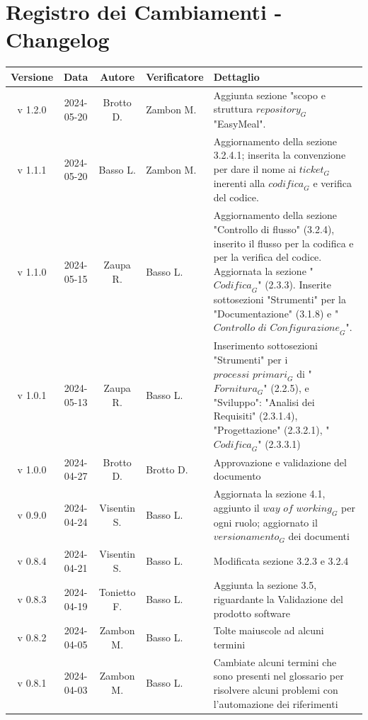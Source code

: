 \documentclass[12pt, oneside]{article}
\begin{document}
\section*{Registro dei Cambiamenti - Changelog}
\begin{longtable}{|c|c|c|p{3cm}|p{7cm}|}
\hline
\textbf{Versione} & \textbf{Data} & \textbf{Autore} & \textbf{Verificatore} & \textbf{Dettaglio} \\
\hline
v 1.2.0 & 2024-05-20 & Brotto D. & Zambon M. & Aggiunta sezione "scopo e struttura $\textit{repository}_G$ "EasyMeal". \\
\hline
v 1.1.1 & 2024-05-20 & Basso L. & Zambon M. & Aggiornamento della sezione 3.2.4.1; inserita la convenzione per dare il nome ai $\textit{ticket}_G$ inerenti alla $\textit{codifica}_G$ e verifica del codice. \\
\hline
v 1.1.0 & 2024-05-15 & Zaupa R. & Basso L. & Aggiornamento della sezione "Controllo di flusso" (3.2.4), inserito il flusso per la codifica e per la verifica del codice. Aggiornata la sezione "$\textit{Codifica}_G$" (2.3.3). Inserite sottosezioni "Strumenti" per la "Documentazione" (3.1.8) e "$\textit{Controllo di Configurazione}_G$".\\
\hline
v 1.0.1 & 2024-05-13 & Zaupa R. & Basso L. & Inserimento sottosezioni "Strumenti" per i $\textit{processi primari}_G$ di "$\textit{Fornitura}_G$" (2.2.5), e "Sviluppo": "Analisi dei Requisiti" (2.3.1.4), "Progettazione" (2.3.2.1), "$\textit{Codifica}_G$" (2.3.3.1) \\
\hline
v 1.0.0 & 2024-04-27 & Brotto D. & Brotto D. & Approvazione e validazione del documento \\
\hline
v 0.9.0 & 2024-04-24 & Visentin S. & Basso L. & Aggiornata la sezione 4.1, aggiunto il $\textit{way of working}_G$ per ogni ruolo; aggiornato il $\textit{versionamento}_G$ dei documenti \\
\hline
v 0.8.4 & 2024-04-21 & Visentin S. & Basso L. & Modificata sezione 3.2.3 e 3.2.4 \\
\hline
v 0.8.3 & 2024-04-19 & Tonietto F. & Basso L. & Aggiunta la sezione 3.5, riguardante la Validazione del prodotto software\\
\hline
v 0.8.2 & 2024-04-05 & Zambon M. & Basso L. & Tolte maiuscole ad alcuni termini\\
\hline
v 0.8.1 & 2024-04-03 & Zambon M. & Basso L. & Cambiate alcuni termini che sono presenti nel glossario per risolvere alcuni problemi con l'automazione dei riferimenti\\

\end{longtable}
\end{document}
